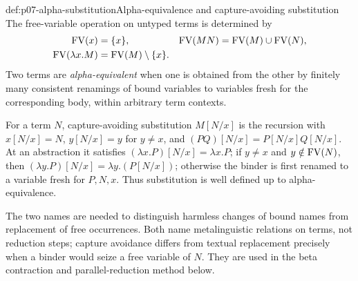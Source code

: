 \begin{hbdefinition}{def:p07-alpha-substitution}{Alpha-equivalence and capture-avoiding substitution}
The free-variable operation on untyped terms is determined by
\[
\begin{aligned}
 \operatorname{FV}(x)&=\{x\},&
 \operatorname{FV}(MN)&=\operatorname{FV}(M)\cup\operatorname{FV}(N),\\
 \operatorname{FV}(\lambda x.M)&=\operatorname{FV}(M)\setminus\{x\}.&&
\end{aligned}
\]
Two terms are \emph{alpha-equivalent} when one is obtained from the other by
finitely many consistent renamings of bound variables to variables fresh for
the corresponding body, within arbitrary term contexts.

For a term \(N\), capture-avoiding substitution \(M[N/x]\) is the recursion
with \(x[N/x]=N\), \(y[N/x]=y\) for \(y\neq x\), and
\((PQ)[N/x]=P[N/x]Q[N/x]\).  At an abstraction it satisfies
\((\lambda x.P)[N/x]=\lambda x.P\); if \(y\neq x\) and
\(y\notin\operatorname{FV}(N)\), then
\((\lambda y.P)[N/x]=\lambda y.(P[N/x])\); otherwise the binder is first
renamed to a variable fresh for \(P,N,x\).  Thus substitution is well defined
up to alpha-equivalence.

The two names are needed to distinguish harmless changes of bound names from
replacement of free occurrences.  Both name metalinguistic relations on
terms, not reduction steps; capture avoidance differs from textual
replacement precisely when a binder would seize a free variable of \(N\).
They are used in the beta contraction and parallel-reduction method below.
\end{hbdefinition}

